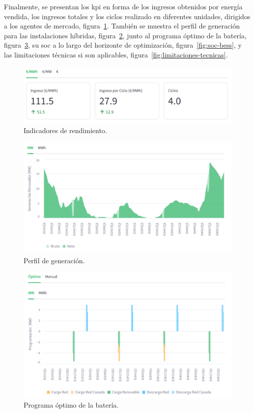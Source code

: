 Finalmente, se presentan los \gls{kpi} en forma de los ingresos obtenidos por energía vendida, los ingresos totales y los ciclos realizado en diferentes unidades, dirigidos a los agentes de mercado, figura~\ref{fig:kpi-sistema}. También se muestra el perfil de generación para las instalaciones híbridas, figura~\ref{fig:perfil-generacion}, junto al programa óptimo de la batería, figura~\ref{fig:programa-optimo}, su \gls{soc} a lo largo del horizonte de optimización, figura~\ref{fig:soc-bess}, y las limitaciones técnicas si son aplicables, figura~\ref{fig:limitaciones-tecnicas}.

\begin{figure}
  \centering
  \includegraphics[width=0.75\linewidth]{figures/kpi-sistema.png}
  \caption[Indicadores de rendimiento.]{Indicadores de rendimiento.}
  \label{fig:kpi-sistema}
\end{figure}

\begin{figure}
  \centering
  \includegraphics[width=0.75\linewidth]{figures/perfil-generacion.png}
  \caption[Perfil de generación.]{Perfil de generación.}
  \label{fig:perfil-generacion}
\end{figure}

\begin{figure}
  \centering
  \includegraphics[width=0.75\linewidth]{figures/programa-optimo.png}
  \caption[Programa óptimo de la batería.]{Programa óptimo de la batería.}
  \label{fig:programa-optimo}
\end{figure}

